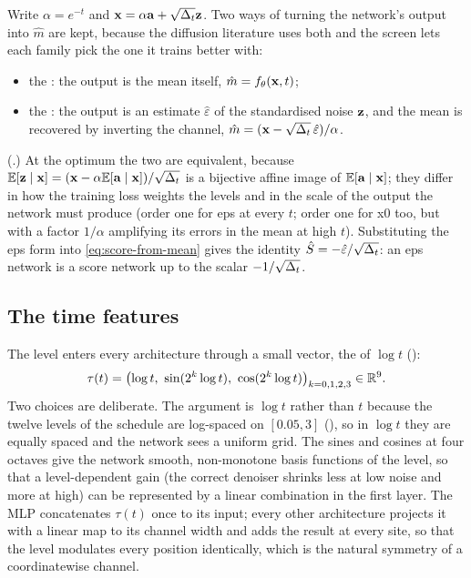Write $\alpha=e^{-t}$ and $\mathbf{x}=\alpha\mathbf{a}+\sqrt{\Delta_t}\mathbf{z}$. Two ways of turning the
network's output into $\hat m$ are kept, because the diffusion literature uses both and
the screen lets each family pick the one it trains better with:
\begin{itemize}
\item the : the output is the mean itself, $\hat m=f_\theta(\mathbf{x},t)$;
\item the : the output is an estimate $\hat\varepsilon$ of the
  standardised noise $\mathbf{z}$, and the mean is recovered by inverting the channel,
  $\hat m=(\mathbf{x}-\sqrt{\Delta_t}\,\hat\varepsilon)/\alpha$.
\end{itemize}
(.) At the optimum the two are equivalent, because
$\mathbb{E}[\mathbf{z}\mid\mathbf{x}]=(\mathbf{x}-\alpha\mathbb{E}[\mathbf{a}\mid\mathbf{x}])/\sqrt{\Delta_t}$ is a bijective affine image of
$\mathbb{E}[\mathbf{a}\mid\mathbf{x}]$; they differ in how the training loss weights the levels and in the
scale of the output the network must produce (order one for eps at every $t$; order one
for x0 too, but with a factor $1/\alpha$ amplifying its errors in the mean at high $t$).
Substituting the eps form into \cref{eq:score-from-mean} gives the identity
$\hat{S}=-\hat\varepsilon/\sqrt{\Delta_t}$: an eps network is a score network up to the
scalar $-1/\sqrt{\Delta_t}$.

\subsection{The time features}

The level enters every architecture through a small vector, the 
of $\log t$ ():
\begin{equation}
  \tau(t)=\bigl(\log t,\ \sin(2^k\log t),\ \cos(2^k\log t)\bigr)_{k=0,1,2,3}\in\mathbb{R}^{9}.
  \label{eq:time-features}
\end{equation}
Two choices are deliberate. The argument is $\log t$ rather than $t$ because the
twelve levels of the schedule are log-spaced on $[0.05,3]$ (), so in
$\log t$ they are equally spaced and the network sees a uniform grid. The sines and
cosines at four octaves give the network smooth, non-monotone basis functions of the
level, so that a level-dependent gain (the correct denoiser shrinks less at low noise
and more at high) can be represented by a linear combination in the first layer. The
MLP concatenates $\tau(t)$ once to its input; every other architecture projects it with
a linear map to its channel width and adds the result at every site, so that the level
modulates every position identically, which is the natural symmetry of a coordinatewise
channel.

